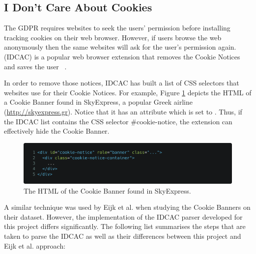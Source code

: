 \documentclass[../main.tex]{subfiles}
\begin{document}
\subsection{I Don't Care About Cookies}

The GDPR requires websites to seek the users’ permission before installing tracking cookies on their web browser. However, if users browse the web anonymously then the same websites will ask for the user’s permission again.  (IDCAC) is a popular web browser extension that removes the Cookie Notices and saves the user ~\cite{kladnik}. 

In order to remove those notices, IDCAC has built a list of CSS selectors that websites use for their Cookie Notices. For example, Figure \ref{fig:design_skyexpress} depicts the HTML of a Cookie Banner found in SkyExpress, a popular Greek airline (\url{http://skyexpress.gr}). Notice that it has an  attribute which is set to . Thus, if the IDCAC list contains the CSS selector {\selectfont \#cookie-notice}, the extension can effectively hide the Cookie Banner.

\begin{figure}[ht]
    \centering
    \includegraphics[width=\textwidth]{images/implementation/skyexpress.png}
    \caption{The HTML of the Cookie Banner found in SkyExpress.}
    \label{fig:design_skyexpress}
\end{figure}

A similar technique was used by Eijk et al. when studying the Cookie Banners on their dataset. However, the implementation of the IDCAC parser developed for this project differs significantly. The following list summarises the steps that are taken to parse the IDCAC as well as their differences between this project and Eijk et al. approach:
\end{document}
